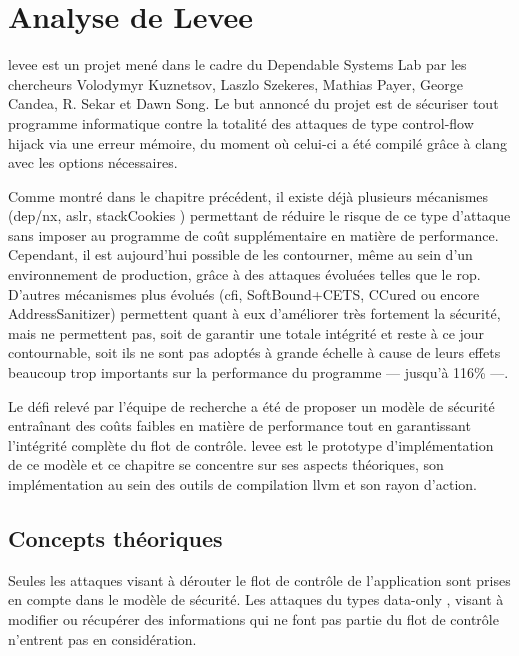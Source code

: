 \chapter{Analyse de Levee}
\label{chap:levee}

\gls{levee} est un projet mené dans le cadre du Dependable Systems Lab \cite{dslab} par les chercheurs Volodymyr Kuznetsov, Laszlo Szekeres, Mathias Payer, George Candea, R. Sekar et Dawn Song. Le but annoncé du projet est de sécuriser tout programme informatique contre la totalité des attaques de type \og control-flow hijack \fg via une erreur mémoire, du moment où celui-ci a été compilé grâce à \gls{clang} avec les options nécessaires.

Comme montré dans le chapitre précédent, il existe déjà plusieurs mécanismes (\gls{dep}/\gls{nx}, \gls{aslr}, \og \gls{stackCookies} \fg) permettant de réduire le risque de ce type d'attaque sans imposer au programme de coût supplémentaire en matière de performance. Cependant, il est aujourd'hui possible de les contourner, même au sein d'un environnement de production, grâce à des attaques évoluées telles que le \gls{rop}. D'autres mécanismes plus évolués (\gls{cfi}, SoftBound+CETS, CCured ou encore AddressSanitizer) permettent quant à eux d'améliorer très fortement la sécurité, mais ne permettent pas, soit de garantir une totale intégrité et reste à ce jour contournable, soit ils ne sont pas adoptés à grande échelle à cause de leurs effets beaucoup trop importants sur la performance du programme --- jusqu'à 116\% ---.

Le défi relevé par l'équipe de recherche a été de proposer un modèle de sécurité entraînant des coûts faibles en matière de performance tout en garantissant l'intégrité complète du flot de contrôle. \gls{levee} est le prototype d'implémentation de ce modèle et ce chapitre se concentre sur ses aspects théoriques, son implémentation au sein des outils de compilation \gls{llvm} et son rayon d'action.

\minitoc

\newpage

\section{Concepts théoriques}

Seules les attaques visant à dérouter le flot de contrôle de l'application sont prises en compte dans le modèle de sécurité. Les attaques du types \og data-only \fg, visant à modifier ou récupérer des informations qui ne font pas partie du flot de contrôle n'entrent pas en considération.

